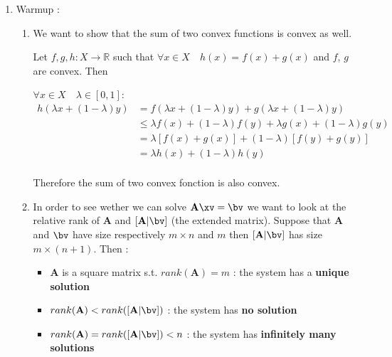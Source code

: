 \documentclass{../../tex_import/ETHuebung_english}
\begin{document}


\begin{enumerate}
	

\item{Warmup :}
	\begin{enumerate}
		
		\item We want to show that the sum of two convex functions is convex as well.

		Let $f,g,h \colon X \to \mathbb{R}$ such that $\forall x \in X \quad h(x) = f(x) + g(x)$ and $f$, $g$ are convex. Then 
		
		$\forall x \in X \quad \lambda \in [0,1]$:
		\begin{equation*}
			\begin{split}
				h(\lambda x + (1-\lambda) y ) &= f(\lambda x + (1-\lambda) y ) + g(\lambda x + (1-\lambda) y )\\
				&\le \lambda f(x) + (1-\lambda)f(y) + \lambda g(x) + (1-\lambda)g(y)\\
				&= \lambda \left[f(x) +  g(x)\right] + (1-\lambda)\left[f(y) + g(y)\right]\\
				&= \lambda h(x) + (1-\lambda)h(y)\\
			\end{split}
		\end{equation*}
	
		Therefore the sum of two convex fonction is also convex.
		
		\item In order to see wether we can solve $\mathbf{A}\xv = \bv$ we want to look at the relative rank of $\mathbf{A}$ and $[\mathbf{A}|\bv]$ (the extended matrix). Suppose that $\mathbf{A}$ and $\bv$ have size respectively $m \times n$ and $m$ then $[\mathbf{A}|\bv]$ has size $m \times (n+1)$. Then :
			\begin{itemize}
				\item $\mathbf{A}$ is a square matrix s.t. $rank(\mathbf{A})=m$ : the system has a \textbf{unique solution} 
				\item $rank(\mathbf{A}) < rank([\mathbf{A}|\bv])$ : the system has \textbf{no solution} 					
				\item $rank(\mathbf{A}) = rank([\mathbf{A}|\bv]) < n$ : the system has \textbf{infinitely many solutions} 					
			\end{itemize}


\end{enumerate}
\end{enumerate}
\end{document}
